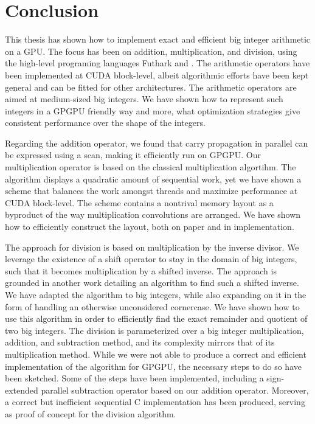 \section{Conclusion}
\label{sec:conc}
This thesis has shown how to implement exact and efficient big integer
arithmetic on a GPU. The focus has been on addition, multiplication, and
division, using the high-level programing languages Futhark and \cpp. The
arithmetic operators have been implemented at CUDA block-level, albeit
algorithmic efforts have been kept general and can be fitted for other
architectures. The arithmetic operators are aimed at medium-sized big integers.
We have shown how to represent such integers in a GPGPU friendly way and more,
what optimization strategies give consistent performance over the shape of the
integers.

Regarding the addition operator, we found that carry propagation in parallel can
be expressed using a scan, making it efficiently run on GPGPU. Our
multiplication operator is based on the classical multiplication algortihm. The
algorithm displays a quadratic amount of sequential work, yet we have shown a
scheme that balances the work amongst threads and maximize performance at CUDA
block-level. The scheme contains a nontrival memory layout as a byproduct of the
way multiplication convolutions are arranged. We have shown how to efficiently
construct the layout, both on paper and in implementation.

The approach for division is based on multiplication by the inverse divisor. We
leverage the existence of a shift operator to stay in the domain of big
integers, such that it becomes multiplication by a shifted inverse. The approach
is grounded in another work detailing an algorithm to find such a shifted
inverse. We have adapted the algorithm to big integers, while also expanding on
it in the form of handling an otherwise unconsidered cornercase. We have shown
how to use this algorithm in order to efficiently find the exact remainder and
quotient of two big integers. The division is parameterized over a big integer
multiplication, addition, and subtraction method, and its complexity mirrors
that of its multiplication method. While we were not able to produce a correct
and efficient implementation of the algorithm for GPGPU, the necessary steps to
do so have been sketched. Some of the steps have been implemented, including a
sign-extended parallel subtraction operator based on our addition
operator. Moreover, a correct but inefficient sequential C implementation has
been produced, serving as proof of concept for the division algorithm.

